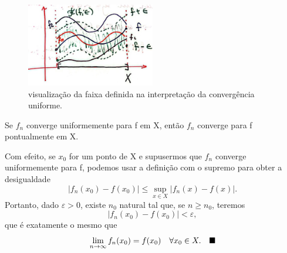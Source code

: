 \documentclass[../analysisII_notes.tex]{subfiles}
\begin{document}
\begin{figure}[H]
	\begin{center}
		\includegraphics[height=0.5\textheight, width=0.5\textwidth, keepaspectratio]{./Images/epsilon_band_16.png}
	\end{center}
	\caption{visualização da faixa definida na interpretação da convergência uniforme.}
	\label{epsband16}
\end{figure}

\begin{prop*}
	Se \(f_{n}\) converge uniformemente para f em X, então \(f_{n}\) converge para f pontualmente em X.
\end{prop*}
\begin{proof*}
	Com efeito, se \(x_{0}\) for um ponto de X e supusermos que \(f_{n}\) converge uniformemente para f, podemos usar a definição com o supremo para obter a desigualdade
	\[
		|f_{n}(x_{0})-f(x_{0})|\leq \sup_{x\in X}|f_{n}(x)-f(x)|.
	\]
	Portanto, dado \(\varepsilon > 0\), existe \(n_{0}\) natural tal que, se \(n\geq n_{0}\), teremos
	\[
		|f_{n}(x_{0})-f(x_{0})|<\varepsilon ,
	\]
	que é exatamente o mesmo que
	\[
		\lim_{n\to \infty}f_{n}(x_{0})=f(x_{0}) \quad \forall x_{0}\in X. \quad \text{$\blacksquare$}
	\]
\end{proof*}
\end{document}
